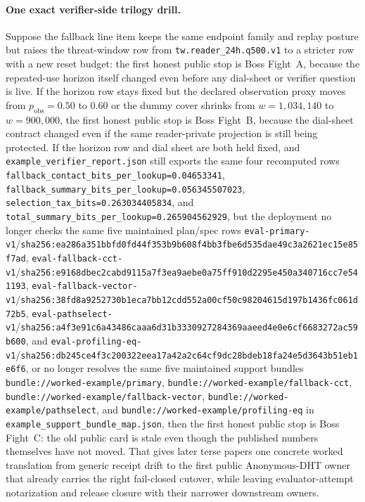\documentclass[11pt]{article}
\begin{document}
\paragraph{One exact verifier-side trilogy drill.}
Suppose the fallback line item keeps the same endpoint family and replay posture but raises the threat-window row from \texttt{tw.reader\_24h.q500.v1} to a stricter row with a new reset budget: the first honest public stop is Boss Fight~A, because the repeated-use horizon itself changed even before any dial-sheet or verifier question is live.
If the horizon row stays fixed but the declared observation proxy moves from $p_{\mathrm{obs}}=0.50$ to $0.60$ or the dummy cover shrinks from $w=1{,}034{,}140$ to $w=900{,}000$, the first honest public stop is Boss Fight~B, because the dial-sheet contract changed even if the same reader-private projection is still being protected.
If the horizon row and dial sheet are both held fixed, and \texttt{example\_verifier\_report.json} still exports the same four recomputed rows \texttt{fallback\_contact\_bits\_per\_lookup=0.04653341}, \texttt{fallback\_summary\_bits\_per\_lookup=0.056345507023}, \texttt{selection\_tax\_bits=0.263034405834}, and \texttt{total\_summary\_bits\_per\_lookup=0.265904562929}, but the deployment no longer checks the same five maintained plan/spec rows \texttt{eval-primary-v1}/\texttt{sha256:ea286a351bbfd0fd44f353b9b608f4bb3fbe6d535dae49c3a2621ec15e85f7ad}, \texttt{eval-fallback-cct-v1}/\texttt{sha256:e9168dbec2cabd9115a7f3ea9aebe0a75ff910d2295e450a340716cc7e541193}, \texttt{eval-fallback-vector-v1}/\texttt{sha256:38fd8a9252730b1eca7bb12cdd552a00cf50c98204615d197b1436fc061d72b5}, \texttt{eval-pathselect-v1}/\texttt{sha256:a4f3e91c6a43486caaa6d31b3330927284369aaeed4e0e6cf6683272ac59b600}, and \texttt{eval-profiling-eq-v1}/\texttt{sha256:db245ce4f3c200322eea17a42a2c64cf9dc28bdeb18fa24e5d3643b51eb1e6f6}, or no longer resolves the same five maintained support bundles \texttt{bundle://worked-example/primary}, \texttt{bundle://worked-example/fallback-cct}, \texttt{bundle://worked-example/fallback-vector}, \texttt{bundle://worked-example/pathselect}, and \texttt{bundle://worked-example/profiling-eq} in \texttt{example\_support\_bundle\_map.json}, then the first honest public stop is Boss Fight~C: the old public card is stale even though the published numbers themselves have not moved.
That gives later terse papers one concrete worked translation from generic receipt drift to the first public Anonymous-DHT owner that already carries the right fail-closed cutover, while leaving evaluator-attempt notarization and release closure with their narrower downstream owners.\cite{series:bossfightA,series:bossfightB,series:bossfightC,series:evalnotary,series:releaseproperty}
\end{document}
